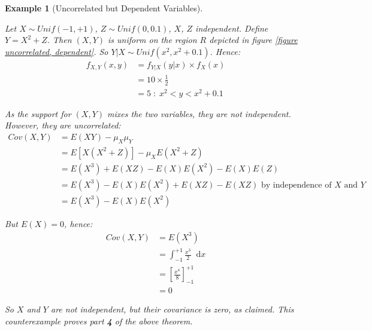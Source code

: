 \documentclass[12pt,a4paper]{article}
\newcommand{\diff}{\;\mathrm{d}}
\newtheorem{ex}[thm]{Example}
\begin{document}
\begin{ex}[Uncorrelated but Dependent Variables]\label{uncorrelated, dependent}\vspace{1cm}

Let $X \sim Unif(-1,+1)$, $Z \sim Unif(0,0.1)$, $X$, $Z$ independent. Define $Y=X^2 + Z$. Then $(X,Y)$ is uniform on the region $R$ depicted in figure \ref{figure uncorrelated, dependent}. So $Y|X \sim Unif(x^2,x^2+0.1)$. Hence:
\begin{align*}
f_{X,Y}(x,y) &= f_{Y|X}(y|x) \times f_X(x)\\
&= 10 \times \frac{1}{2}\\
&= 5 \; : \; x^2 < y < x^2 + 0.1
\end{align*}

As the support for $(X,Y)$ mixes the two variables, they are not independent. However, they are uncorrelated:
\begin{align*}
Cov(X,Y) &= E(XY) - \mu_X\mu_Y\\
&= E[X(X^2+Z)] - \mu_XE(X^2+Z)\\
&= E(X^3) + E(XZ) - E(X)E(X^2) - E(X)E(Z)\\
&= E(X^3)-E(X)E(X^2) + E(XZ) - E(XZ) \mbox{ by independence of $X$ and $Y$}\\
&=E(X^3)-E(X)E(X^2)
\end{align*}

But $E(X) = 0$, hence:
\begin{align*}
Cov(X,Y) &= E(X^3)\\
&= \int_{-1}^{+1}\!\! \frac{x^3}{2}\;\diff x\\
&= \left[\frac{x^4}{8}\right]_{-1}^{+1}\\
&= 0
\end{align*}

So $X$ and $Y$ are not independent, but their covariance is zero, as claimed. This counterexample proves part \textbf{4} of the above theorem.
\end{ex}
\end{document}
